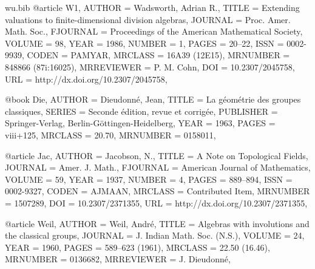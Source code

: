 \documentclass{amsart}
\numberwithin{equation}{section}
\theoremstyle{plain}
\theoremstyle{definition}
\begin{document}
\begin{filecontents}{wu.bib}
@article {W1,
    AUTHOR = {Wadsworth, Adrian R.},
     TITLE = {Extending valuations to finite-dimensional division algebras},
   JOURNAL = {Proc. Amer. Math. Soc.},
  FJOURNAL = {Proceedings of the American Mathematical Society},
    VOLUME = {98},
      YEAR = {1986},
    NUMBER = {1},
     PAGES = {20--22},
      ISSN = {0002-9939},
     CODEN = {PAMYAR},
   MRCLASS = {16A39 (12E15)},
  MRNUMBER = {848866 (87i:16025)},
MRREVIEWER = {P. M. Cohn},
       DOI = {10.2307/2045758},
       URL = {http://dx.doi.org/10.2307/2045758},
}

@book {Die,
	AUTHOR = {Dieudonn{\'e}, Jean},
	TITLE = {La g\'eom\'etrie des groupes classiques},
	SERIES = {Seconde \'edition, revue et corrig\'ee},
	PUBLISHER = {Springer-Verlag, Berlin-G\"ottingen-Heidelberg},
	YEAR = {1963},
	PAGES = {viii+125},
	MRCLASS = {20.70},
	MRNUMBER = {0158011},
}

@article {Jac,
	AUTHOR = {Jacobson, N.},
	TITLE = {A {N}ote on {T}opological {F}ields},
	JOURNAL = {Amer. J. Math.},
	FJOURNAL = {American Journal of Mathematics},
	VOLUME = {59},
	YEAR = {1937},
	NUMBER = {4},
	PAGES = {889--894},
	ISSN = {0002-9327},
	CODEN = {AJMAAN},
	MRCLASS = {Contributed Item},
	MRNUMBER = {1507289},
	DOI = {10.2307/2371355},
	URL = {http://dx.doi.org/10.2307/2371355},
}

@article {Weil,
	AUTHOR = {Weil, Andr{\'e}},
	TITLE = {Algebras with involutions and the classical groups},
	JOURNAL = {J. Indian Math. Soc. (N.S.)},
	VOLUME = {24},
	YEAR = {1960},
	PAGES = {589--623 (1961)},
	MRCLASS = {22.50 (16.46)},
	MRNUMBER = {0136682},
	MRREVIEWER = {J. Dieudonn{\'e}},
}
\end{filecontents}

\newpage

\end{document}
